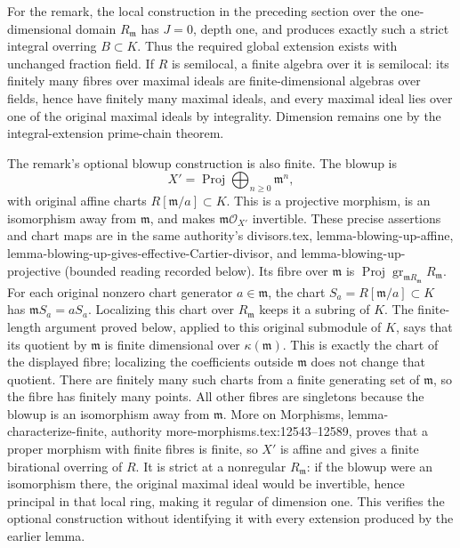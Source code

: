 For the remark, the local construction in the preceding section over the one-dimensional domain \(R_{\mathfrak m}\) has \(J=0\), depth one, and produces exactly such a strict integral overring \(B\subset K\). Thus the required global extension exists with unchanged fraction field. If \(R\) is semilocal, a finite algebra over it is semilocal: its finitely many fibres over maximal ideals are finite-dimensional algebras over fields, hence have finitely many maximal ideals, and every maximal ideal lies over one of the original maximal ideals by integrality. Dimension remains one by the integral-extension prime-chain theorem.

The remark's optional blowup construction is also finite. The blowup is \[
 X'=\operatorname{Proj}\bigoplus_{n\ge0}\mathfrak m^n,
\] with original affine charts \(R[\mathfrak m/a]\subset K\). This is a projective morphism, is an isomorphism away from \(\mathfrak m\), and makes \(\mathfrak m\mathcal O_{X'}\) invertible. These precise assertions and chart maps are in the same authority's divisors.tex, lemma-\AlgebraIdentifierBreak{}blowing-\AlgebraIdentifierBreak{}up-\AlgebraIdentifierBreak{}affine, lemma-\AlgebraIdentifierBreak{}blowing-\AlgebraIdentifierBreak{}up-\AlgebraIdentifierBreak{}gives-\AlgebraIdentifierBreak{}effective-\AlgebraIdentifierBreak{}Cartier-\AlgebraIdentifierBreak{}divisor, and lemma-\AlgebraIdentifierBreak{}blowing-\AlgebraIdentifierBreak{}up-\AlgebraIdentifierBreak{}projective (bounded reading recorded below). Its fibre over \(\mathfrak m\) is \(\operatorname{Proj}\operatorname{gr}_{\mathfrak mR_{\mathfrak m}}R_{\mathfrak m}\). For each original nonzero chart generator \(a\in\mathfrak m\), the chart \(S_a=R[\mathfrak m/a]\subset K\) has \(\mathfrak mS_a=aS_a\). Localizing this chart over \(R_{\mathfrak m}\) keeps it a subring of \(K\). The finite-length argument proved below, applied to this original submodule of \(K\), says that its quotient by \(\mathfrak m\) is finite dimensional over \(\kappa(\mathfrak m)\). This is exactly the chart of the displayed fibre; localizing the coefficients outside \(\mathfrak m\) does not change that quotient. There are finitely many such charts from a finite generating set of \(\mathfrak m\), so the fibre has finitely many points. All other fibres are singletons because the blowup is an isomorphism away from \(\mathfrak m\). More on Morphisms, lemma-\AlgebraIdentifierBreak{}characterize\AlgebraIdentifierBreak{}-\AlgebraIdentifierBreak{}finite, authority more-\AlgebraIdentifierBreak{}morphisms.\AlgebraIdentifierBreak{}tex:\AlgebraIdentifierBreak{}12543--\AlgebraIdentifierBreak{}12589, proves that a proper morphism with finite fibres is finite, so \(X'\) is affine and gives a finite birational overring of \(R\). It is strict at a nonregular \(R_{\mathfrak m}\): if the blowup were an isomorphism there, the original maximal ideal would be invertible, hence principal in that local ring, making it regular of dimension one. This verifies the optional construction without identifying it with every extension produced by the earlier lemma.

